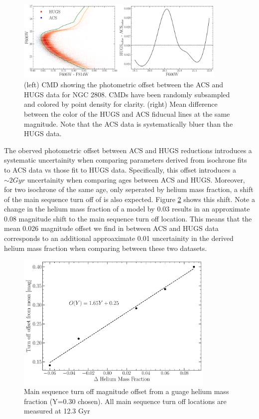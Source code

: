\begin{figure}
  \centering
  \includegraphics[width=0.90\textwidth]{figures/ngc2808/photometricOffset.pdf}
  \caption{(left) CMD showing the photometric offset between the ACS and HUGS data for NGC 2808. CMDs have been randomly subsampled and colored by point density for clarity. (right) Mean difference between the color of the HUGS and ACS fiducual lines at the same magnitude. Note that the ACS data is systematically bluer than the HUGS data.}
  \label{fig:offset}
\end{figure}

The oberved photometric offset between ACS and HUGS reductions introduces a
systematic uncertainity when comparing parameters derived from isochrone fits
to ACS data vs those fit to HUGS data. Specifically, this offset introduces a
$\sim 2 Gyr$ uncertainity when comparing ages between ACS and HUGS. Moreover,
for two isochrone of the same age, only seperated by helium mass fraction, a
shift of the main sequence turn off of is also expected. Figure \ref{fig:HeMO}
shows this shift. Note a change in the helium mass fraction of a model by 0.03
results in an approximate 0.08 magnitude shift to the main sequence turn off
location. This means that the mean 0.026 magnitude offset we find in between
ACS and HUGS data corresponds to an additional approaximate 0.01 uncertainity
in the derived helium mass fraction when comparing between these two datasets. 

\begin{figure}
  \centering
  \includegraphics[width=0.85\textwidth]{figures/ngc2808/HeliumMeanOffset.pdf}
  \caption{Main sequence turn off magnitude offset from a guage helium mass fraction (Y=0.30 chosen). All main sequence turn off locations are measured at 12.3 Gyr}
  \label{fig:HeMO}
\end{figure}

